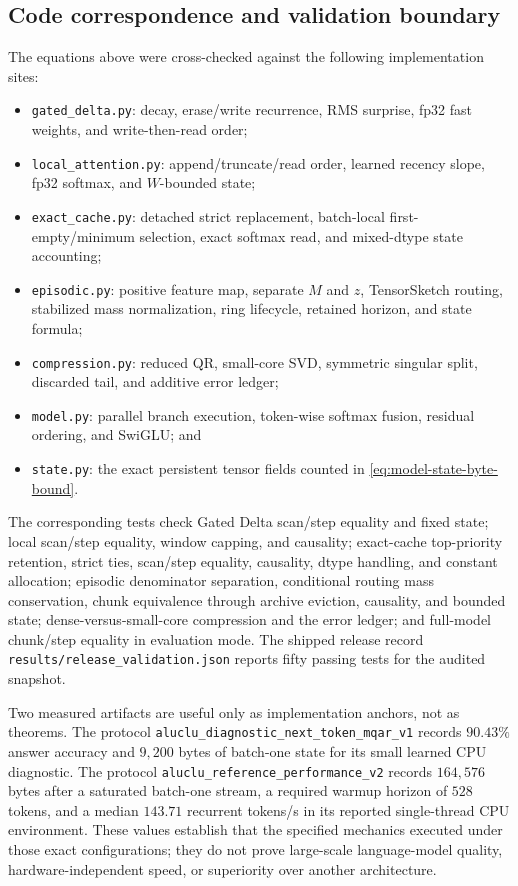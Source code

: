 \subsection{Code correspondence and validation boundary}
\label{subsec:code-correspondence}

The equations above were cross-checked against the following implementation
sites:
\begin{itemize}
  \item \texttt{gated\_delta.py}: decay, erase/write recurrence, RMS surprise,
        fp32 fast weights, and write-then-read order;
  \item \texttt{local\_attention.py}: append/truncate/read order, learned
        recency slope, fp32 softmax, and \(W\)-bounded state;
  \item \texttt{exact\_cache.py}: detached strict replacement, batch-local
        first-empty/minimum selection, exact softmax read, and mixed-dtype
        state accounting;
  \item \texttt{episodic.py}: positive feature map, separate \(M\) and \(z\),
        TensorSketch routing, stabilized mass normalization, ring lifecycle,
        retained horizon, and state formula;
  \item \texttt{compression.py}: reduced QR, small-core SVD, symmetric singular
        split, discarded tail, and additive error ledger;
  \item \texttt{model.py}: parallel branch execution, token-wise softmax
        fusion, residual ordering, and SwiGLU; and
  \item \texttt{state.py}: the exact persistent tensor fields counted in
        \eqref{eq:model-state-byte-bound}.
\end{itemize}

The corresponding tests check Gated Delta scan/step equality and fixed state;
local scan/step equality, window capping, and causality; exact-cache top-priority
retention, strict ties, scan/step equality, causality, dtype handling, and
constant allocation; episodic denominator separation, conditional routing
mass conservation, chunk equivalence through archive eviction, causality, and
bounded state; dense-versus-small-core compression and the error ledger; and
full-model chunk/step equality in evaluation mode.  The shipped release record
\texttt{results/release\_validation.json} reports fifty passing tests for the
audited snapshot.

Two measured artifacts are useful only as implementation anchors, not as
theorems.  The protocol
\texttt{aluclu\_diagnostic\_next\_token\_mqar\_v1} records \(90.43\%\)
answer accuracy and \(9{,}200\) bytes of batch-one state for its small learned
CPU diagnostic.  The protocol
\texttt{aluclu\_reference\_performance\_v2} records \(164{,}576\) bytes after
a saturated batch-one stream, a required warmup horizon of \(528\) tokens, and
a median \(143.71\) recurrent tokens/s in its reported single-thread CPU
environment.  These values establish that the specified mechanics executed
under those exact configurations; they do not prove large-scale language-model
quality, hardware-independent speed, or superiority over another architecture.
